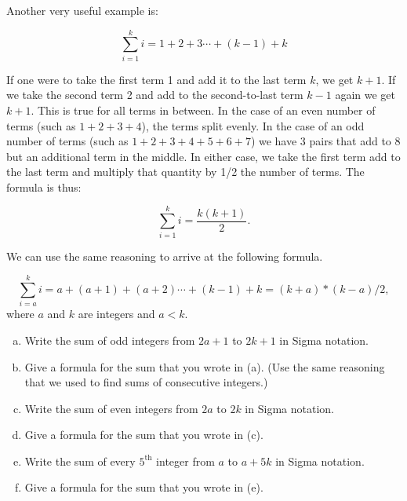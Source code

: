 Another very useful example is:

\[\sum_{i=1}^{k}i=1+2+3\cdots+(k-1) + k\]

If one were to take the first term 1 and add it to the last term $k$, we get $k+1$.  If we take the second term 2 and add to the second-to-last term $k-1$ again we get $k+1$.  This is true for all terms in between.  In the case of an even number of terms (such as $1+2+3+4$),  the terms split evenly.  In the case of an odd number of terms (such as $1+2+3+4+5+6+7$) we have 3 pairs that add to 8 but an additional term in the middle.  In either case, we take the first term add to the last term and multiply that quantity by 1/2 the number of terms.  The formula is thus:

\[\sum_{i=1}^{k}i= \frac{k(k+1)}{2}.\] 

We can use the same reasoning to arrive at the following formula.

\[\sum_{i=a}^{k}i=a+(a+1)+(a+2)\cdots+(k-1) + k = (k+a)*(k-a)/2,\] 
where $a$ and $k$ are integers and $a<k$.

\begin {exercise}{}
\begin {enumerate}[(a)]
\item 
Write the sum of odd integers from $2a+1$ to $2k+1$ in Sigma notation.
\item
Give a formula for the sum that you wrote in (a).  (Use the same reasoning that we used to find sums of consecutive integers.)
\item 
Write the sum of even integers from $2a$ to $2k$ in Sigma notation.
\item
Give a formula for the sum that you wrote in (c). 
\item 
Write the sum of every $5^{\text{th}}$ integer from $a$ to $a + 5k$ in Sigma notation.
\item
Give a formula for the sum that you wrote in (e). 
\end {enumerate}
\end {exercise}

